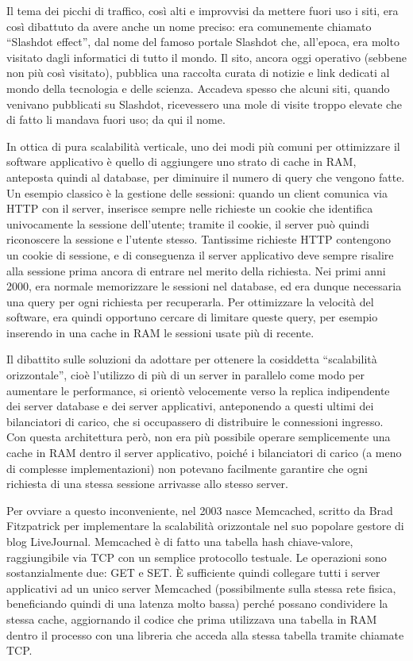 Il tema dei picchi di traffico, così alti e improvvisi da mettere fuori uso i siti,
era così dibattuto da avere anche un nome preciso: era comunemente chiamato ``Slashdot
effect'', dal nome del famoso portale Slashdot che, all'epoca, era molto visitato dagli
informatici di tutto il mondo. Il sito, ancora oggi operativo (sebbene non più così
visitato), pubblica una raccolta curata di notizie e link dedicati al mondo della tecnologia
e delle scienza. Accadeva spesso che alcuni siti, quando venivano pubblicati su Slashdot,
ricevessero una mole di visite troppo elevate che di fatto li mandava fuori uso; da qui
il nome.

In ottica di pura scalabilità verticale, uno dei modi più comuni per ottimizzare il software
applicativo è quello di aggiungere uno strato di cache in RAM, anteposta quindi al database, per
diminuire il numero di query che vengono fatte. Un esempio classico è la gestione delle sessioni:
quando un client comunica via HTTP con il server, inserisce sempre nelle richieste un cookie che
identifica univocamente la sessione dell'utente; tramite il cookie, il server può quindi riconoscere
la sessione e l'utente stesso. Tantissime richieste HTTP contengono un cookie di sessione, e di
conseguenza il server applicativo deve sempre risalire alla sessione prima ancora di entrare nel
merito della richiesta. Nei primi anni 2000, era normale memorizzare le sessioni nel database, ed
era dunque necessaria una query per ogni richiesta per recuperarla. Per ottimizzare la velocità del
software, era quindi opportuno cercare di limitare queste query, per esempio inserendo in una cache
in RAM le sessioni usate più di recente.

Il dibattito sulle soluzioni da adottare per ottenere la cosiddetta ``scalabilità orizzontale'',
cioè l'utilizzo di più di un server in parallelo come modo per aumentare le performance, si orientò
velocemente verso la replica indipendente dei server database e dei server applicativi, anteponendo
a questi ultimi dei bilanciatori di carico, che si occupassero di distribuire le connessioni
ingresso. Con questa architettura però, non era più possibile operare semplicemente una cache in RAM
dentro il server applicativo, poiché i bilanciatori di carico (a meno di complesse implementazioni)
non potevano facilmente garantire che ogni richiesta di una stessa sessione arrivasse allo stesso
server.

Per ovviare a questo inconveniente, nel 2003 nasce Memcached, scritto da Brad Fitzpatrick per
implementare la scalabilità orizzontale nel suo popolare gestore di blog LiveJournal. Memcached è di
fatto una tabella hash chiave-valore, raggiungibile via TCP con un semplice protocollo testuale. Le
operazioni sono sostanzialmente due: GET e SET. È sufficiente quindi collegare tutti i server
applicativi ad un unico server Memcached (possibilmente sulla stessa rete fisica, beneficiando
quindi di una latenza molto bassa) perché possano condividere la stessa cache, aggiornando il codice
che prima utilizzava una tabella in RAM dentro il processo con una libreria che acceda alla stessa
tabella tramite chiamate TCP.

